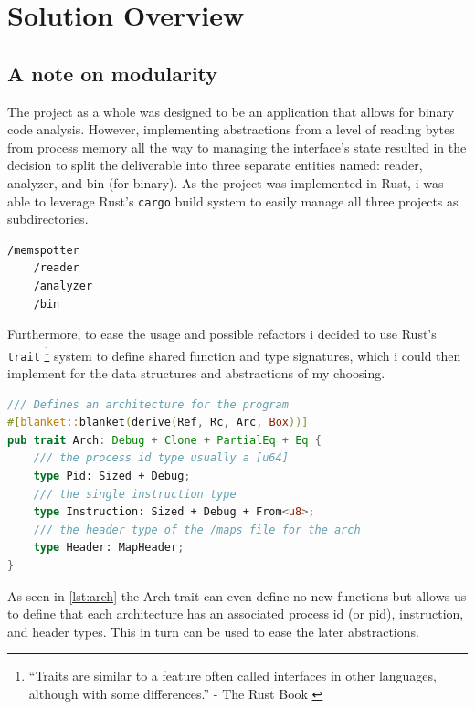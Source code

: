 \chapter{Solution Overview}
\label{cha:implementation}


\section{A note on modularity}

The project as a whole was designed to be an application that allows for binary code analysis. However, implementing abstractions from a level of reading bytes from process memory all the way to managing the interface's state resulted in the decision to split the deliverable into three separate entities named: reader, analyzer, and bin (for binary). As the project was implemented in Rust, i was able to leverage Rust's \verb|cargo| build system to easily manage all three projects as subdirectories.

\begin{lstlisting}[caption={The basic project structure}]
/memspotter
    /reader
    /analyzer
    /bin
\end{lstlisting}

Furthermore, to ease the usage and possible refactors i decided to use Rust's \verb|trait| \footnote{\enquote{Traits are similar to a feature often called interfaces in other languages, although with some differences.} - The Rust Book \cite{klabnik_traits_2023}} system to define shared function and type signatures, which i could then implement for the data structures and abstractions of my choosing.

\begin{lstlisting}[caption=\label{lst:arch}{Trait definition example}, language=Rust,]
/// Defines an architecture for the program
#[blanket::blanket(derive(Ref, Rc, Arc, Box))]
pub trait Arch: Debug + Clone + PartialEq + Eq {
    /// the process id type usually a [u64]
    type Pid: Sized + Debug;
    /// the single instruction type
    type Instruction: Sized + Debug + From<u8>;
    /// the header type of the /maps file for the arch
    type Header: MapHeader;
}    
\end{lstlisting}

As seen in \autoref{lst:arch} the Arch trait can even define no new functions but allows us to define that each architecture has an associated process id (or pid), instruction, and header types. This in turn can be used to ease the later abstractions.

